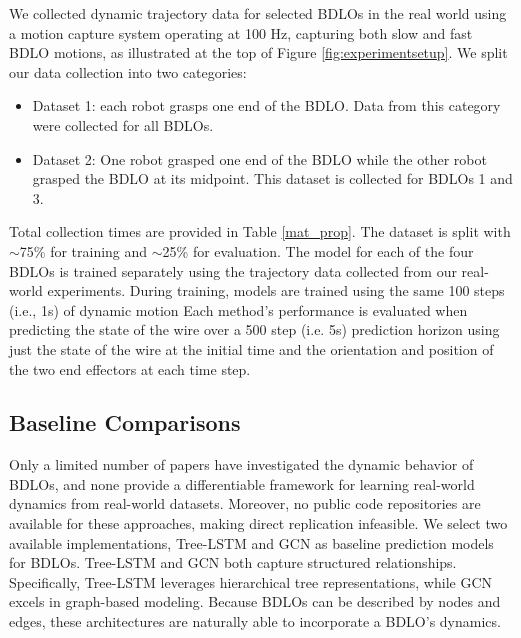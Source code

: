 We collected dynamic trajectory data for selected BDLOs in the real world using a motion capture system operating at 100 Hz, capturing both slow and fast BDLO motions, as illustrated at the top of Figure \ref{fig:experimentsetup}.
We split our data collection into two categories: 
\begin{itemize}
  \item Dataset 1: each robot grasps one end of the BDLO.  
  Data from this category were collected for all BDLOs.
  \item Dataset 2:
  One robot grasped one end of the BDLO while the other robot grasped the BDLO at its midpoint.
  This dataset is collected for BDLOs 1 and 3.
\end{itemize}
Total collection times are provided in Table \ref{mat_prop}.
The dataset is split with \(\sim \)75\% for training and \(\sim \)25\% for evaluation.
The model for each of the four BDLOs is trained separately using the trajectory data collected from our real-world experiments.
During training, models are trained using the same 100 steps (i.e., 1s) of dynamic motion
Each method's performance is evaluated when predicting the state of the wire over a 500 step (i.e. 5s) prediction horizon using just the state of the wire at the initial time and the orientation and position of the two end effectors at each time step. 


\subsection{Baseline Comparisons} 
 Only a limited number of papers have investigated the dynamic behavior of BDLOs, and none provide a differentiable framework for learning real-world dynamics from real-world datasets.
Moreover, no public code repositories are available for these approaches, making direct replication infeasible. 
We select two available implementations, Tree-LSTM \cite{treeLSTM} and GCN \cite{GCN} as baseline prediction models for BDLOs.
Tree-LSTM and GCN both capture structured relationships.
Specifically, Tree-LSTM leverages hierarchical tree representations, while GCN excels in graph-based modeling. 
Because BDLOs can be described by nodes and edges, these architectures are naturally able to incorporate a BDLO's dynamics.

